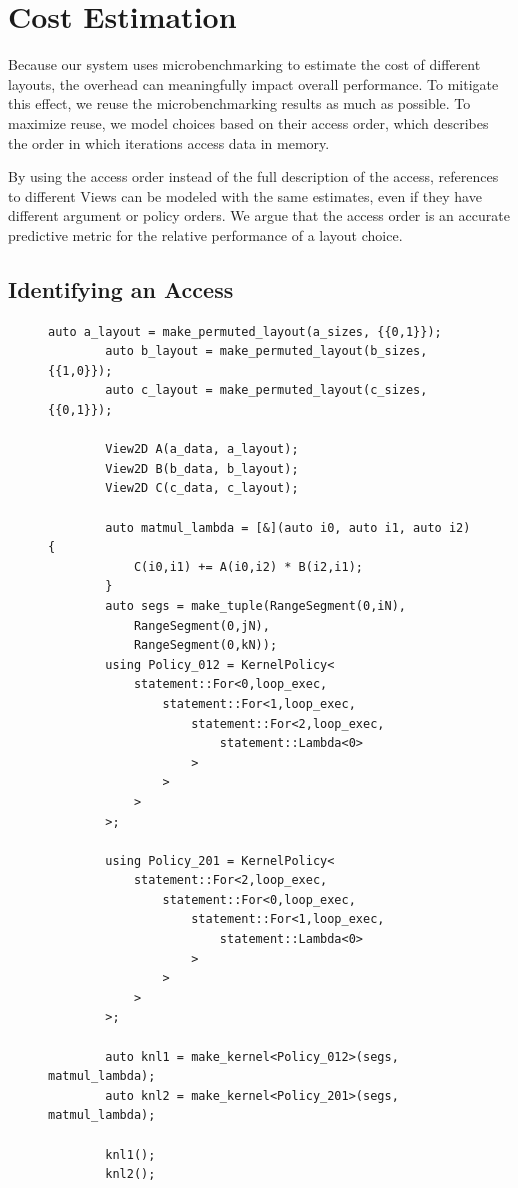 \documentclass[sigconf,review=true]{acmart}
\begin{document}
\section{Cost Estimation}

Because our system uses microbenchmarking to estimate the cost of different layouts, the overhead can meaningfully impact overall performance. 
To mitigate this effect, we reuse the microbenchmarking results as much as possible.
To maximize reuse, we model choices based on their access order, which describes the order in which iterations access data in memory.

By using the access order instead of the full description of the access, references to different Views can be modeled with the same estimates, even if they have different argument or policy orders.
We argue that the access order is an accurate predictive metric for the relative performance of a layout choice. 

\subsection{Identifying an Access}
\begin{figure}[tbp]
	\begin{lstlisting}[caption={Two implementations of matrix multiplication using different kernel policies.}, autogobble, label={MatMulTraversalOrder}]
		auto a_layout = make_permuted_layout(a_sizes, {{0,1}});
		auto b_layout = make_permuted_layout(b_sizes, {{1,0}});
		auto c_layout = make_permuted_layout(c_sizes, {{0,1}});

		View2D A(a_data, a_layout);
		View2D B(b_data, b_layout);
		View2D C(c_data, c_layout);

		auto matmul_lambda = [&](auto i0, auto i1, auto i2) {
			C(i0,i1) += A(i0,i2) * B(i2,i1);
		}
		auto segs = make_tuple(RangeSegment(0,iN), 
			RangeSegment(0,jN), 
			RangeSegment(0,kN));
		using Policy_012 = KernelPolicy<
			statement::For<0,loop_exec,
				statement::For<1,loop_exec,
					statement::For<2,loop_exec,
						statement::Lambda<0>
					>
				>
			>
		>;

		using Policy_201 = KernelPolicy<
			statement::For<2,loop_exec,
				statement::For<0,loop_exec,
					statement::For<1,loop_exec,
						statement::Lambda<0>
					>
				>
			>
		>;

		auto knl1 = make_kernel<Policy_012>(segs, matmul_lambda);
		auto knl2 = make_kernel<Policy_201>(segs, matmul_lambda);

		knl1();
		knl2();
	\end{lstlisting}
\end{figure}
\end{document}
